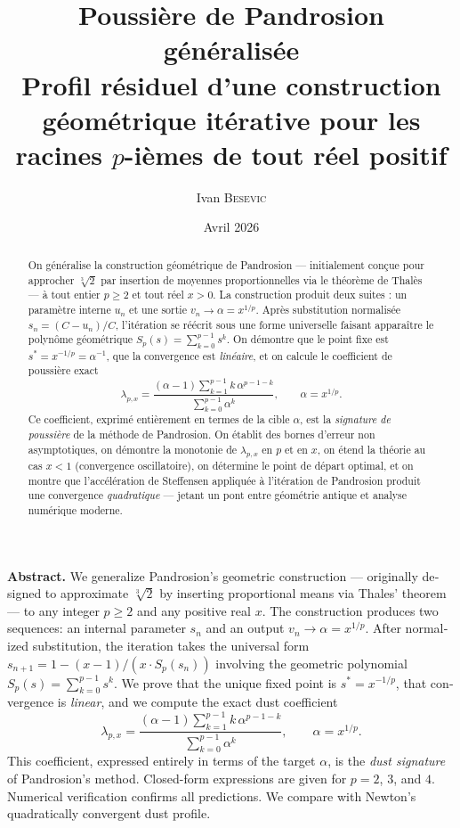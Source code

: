 \documentclass[11pt,a4paper]{article}
\title{\textbf{Poussi\`ere de Pandrosion g\'en\'eralis\'ee}\\[0.3em]
  \large Profil r\'esiduel d'une construction g\'eom\'etrique it\'erative
  pour les racines $p$-i\`emes de tout r\'eel positif}
\author{Ivan \textsc{Besevic}}
\date{Avril 2026}
\theoremstyle{definition}
\newcommand{\cbrt}[1]{\sqrt[3]{#1}}
\begin{document}
\maketitle

\begin{abstract}
On généralise la construction géométrique de Pandrosion --- initialement conçue pour approcher $\cbrt{2}$ par insertion de moyennes proportionnelles via le théorème de Thalès --- à tout entier $p \geq 2$ et tout réel $x > 0$. La construction produit deux suites : un paramètre interne $u_n$ et une sortie $v_n \to \alpha = x^{1/p}$. Après substitution normalisée $s_n = (C - u_n)/C$, l'itération se réécrit sous une forme universelle faisant apparaître le polynôme géométrique $S_p(s) = \sum_{k=0}^{p-1} s^k$. On démontre que le point fixe est $s^* = x^{-1/p} = \alpha^{-1}$, que la convergence est \emph{linéaire}, et on calcule le coefficient de poussière exact
\[
  \lambda_{p,x} = \frac{(\alpha - 1)\displaystyle\sum_{k=1}^{p-1} k\,\alpha^{p-1-k}}{\displaystyle\sum_{k=0}^{p-1} \alpha^k},
  \qquad \alpha = x^{1/p}.
\]
Ce coefficient, exprimé entièrement en termes de la cible $\alpha$, est la \emph{signature de poussière} de la méthode de Pandrosion. On établit des bornes d'erreur non asymptotiques, on démontre la monotonie de $\lambda_{p,x}$ en $p$ et en $x$, on étend la théorie au cas $x < 1$ (convergence oscillatoire), on détermine le point de départ optimal, et on montre que l'accélération de Steffensen appliquée à l'itération de Pandrosion produit une convergence \emph{quadratique} --- jetant un pont entre géométrie antique et analyse numérique moderne.
\end{abstract}

\medskip
\begin{otherlanguage}{english}
\noindent\textbf{Abstract.}
We generalize Pandrosion's geometric construction --- originally designed to approximate $\cbrt{2}$ by inserting proportional means via Thales' theorem --- to any integer $p \geq 2$ and any positive real $x$. The construction produces two sequences: an internal parameter $s_n$ and an output $v_n \to \alpha = x^{1/p}$. After normalized substitution, the iteration takes the universal form $s_{n+1} = 1 - (x-1)/(x \cdot S_p(s_n))$ involving the geometric polynomial $S_p(s) = \sum_{k=0}^{p-1} s^k$. We prove that the unique fixed point is $s^* = x^{-1/p}$, that convergence is \emph{linear}, and we compute the exact dust coefficient
\[
  \lambda_{p,x} = \frac{(\alpha - 1)\displaystyle\sum_{k=1}^{p-1} k\,\alpha^{p-1-k}}{\displaystyle\sum_{k=0}^{p-1} \alpha^k},
  \qquad \alpha = x^{1/p}.
\]
This coefficient, expressed entirely in terms of the target $\alpha$, is the \emph{dust signature} of Pandrosion's method. Closed-form expressions are given for $p=2$, $3$, and $4$. Numerical verification confirms all predictions. We compare with Newton's quadratically convergent dust profile.
\end{otherlanguage}
\end{document}
